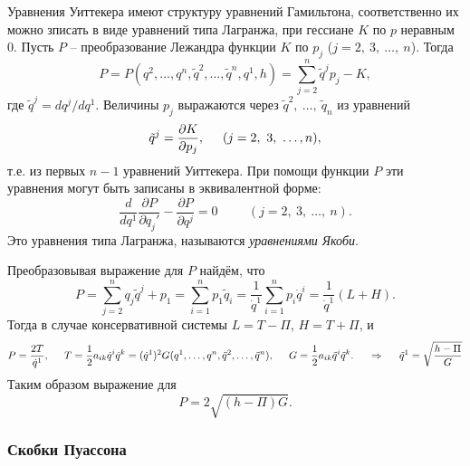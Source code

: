 Уравнения Уиттекера имеют структуру уравнений Гамильтона, соответственно их можно зписать в виде уравнений типа Лагранжа, при гессиане $K$ по $p$ неравным 0. Пусть $P$ -- преобразование Лежандра функции $K$ по $p_j$ ($j = 2, \ 3,\ \ldots,\ n$). Тогда
\begin{equation*}
    P = P(q^2, \ldots, q^n, \tilde q^2, \ldots, \tilde q^n, q^1, h) = \sum_{j = 2}^{n} \tilde q^j p_j - K,
\end{equation*}
где $\tilde q^{j} = d q^j / d q^1$. Величины $p_j$ выражаются через $\tilde q^2, \ \ldots, \ \tilde q_n$ из уравнений 
\begin{equation*}
    \tilde q^j = \frac{\partial K}{\partial p_j}, \hspace{0.5cm} 
    (j = 2, \ 3, \ \ldots, n),
\end{equation*}
т.е. из первых $n-1$ уравнений Уиттекера. При помощи функции $P$ эти уравнения могут быть записаны в эквивалентной форме:
\begin{equation*}
    \frac{d }{d q^1} \frac{\partial P}{\partial q_j'} - \frac{\partial P}{\partial q^j} = 0
    \hspace{1cm} (j = 2,\ 3,\ \ldots,\ n).
\end{equation*}
Это уравнения типа Лагранжа, называются \textit{уравнениями Якоби}.

Преобразовывая выражение для $P$ найдём, что
\begin{equation*}
    P = \sum_{j=2}^{n} q_j \tilde q^j + p_1 = 
    \sum_{i=1}^{n} p_1 \tilde q_i = \frac{1}{\dot{q}^1} \sum_{i=1}^{n} p_i \dot{q}^i = \frac{1}{\dot{q}^1} (L+H).
\end{equation*}
Тогда в случае консервативной системы $L = T - \Pi$, $H = T + \Pi$, и
\begin{equation*}
    P = \frac{2T}{\dot{q}^1},
    \hspace{0.5cm} 
    T = \frac{1}{2} a_{ik} \dot{q}^i \dot{q}^k = (\dot{q}^1)^2 G(q^1, \ldots, q^n, \tilde q^2, \ldots, \tilde q^n),
    \hspace{0.5cm} 
    G = \frac{1}{2} a_{ik} \tilde q^i \tilde q^k.
    \hspace{0.5cm} \Rightarrow \hspace{0.5cm} 
    \tilde q^1 = \sqrt{\frac{h-\Pi}{G} }
\end{equation*}
Таким образом выражение для 
\begin{equation*}
    P = 2 \sqrt{(h-\Pi)G }.
\end{equation*}


\subsubsection*{Скобки Пуассона}

